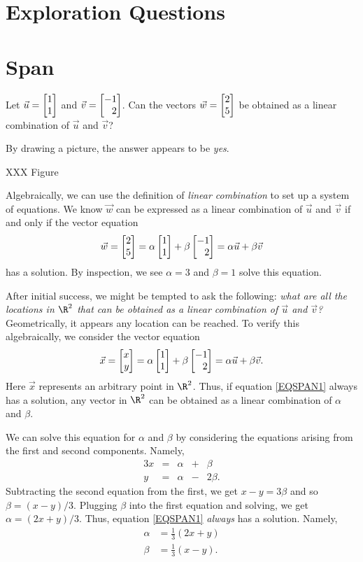 \newpage
\section*{Exploration Questions}

\section{Span}

Let $\vec u=\mat{1\\1}$ and $\vec v=\mat{-1\\2}$. Can the vectors $\vec w=\mat{2\\5}$ be obtained
as a linear combination of $\vec u$ and $\vec v$?

By drawing a picture, the answer appears to be \emph{yes}.

XXX Figure

Algebraically, we can use the definition of \emph{linear combination} to set up a system of equations.
We know $\vec w$ can be expressed as a linear combination of $\vec u$ and $\vec v$ if and only if 
the vector equation
\[
	\vec w = \mat{2\\5}=\alpha\mat{1\\1}+\beta\mat{-1\\2}=\alpha \vec u+\beta \vec v
\]
has a solution. By inspection, we see $\alpha=3$ and $\beta=1$ solve this equation.

After initial success, we might be tempted to ask the following:
\emph{what are all the locations in $\R^2$ that can be obtained
as a linear combination of $\vec u$ and $\vec v$?} Geometrically, it appears
any location can be reached. To verify this algebraically, we consider the vector equation
\begin{equation}
	\label{EQSPAN1}
	\vec x=\mat{x\\y} = \alpha\mat{1\\1}+\beta\mat{-1\\2} = \alpha\vec u+\beta\vec v.
\end{equation}
Here $\vec x$ represents an arbitrary point in $\R^2$. Thus, if equation \eqref{EQSPAN1} always
has a solution, any vector in $\R^2$ can be obtained as a linear combination of $\alpha$ and $\beta$.

We can solve this equation for $\alpha$ and $\beta$ by considering the equations arising from the
first and second components. Namely,
\begin{alignat*}{3}
	x &{}={}& \alpha &{}+{}& \beta\\
	y &{}={}& \alpha &{}-{}& 2\beta.
\end{alignat*}
Subtracting the second equation from the first, we get $x-y=3\beta$ and so $\beta=(x-y)/3$. Plugging 
$\beta$ into the first equation and solving, we get $\alpha=(2x+y)/3$. Thus, equation \eqref{EQSPAN1}
\emph{always} has a solution. Namely,
\begin{align*}
	\alpha &= \tfrac{1}{3}(2x+y)\\
	\beta &= \tfrac{1}{3}(x-y).
\end{align*}

